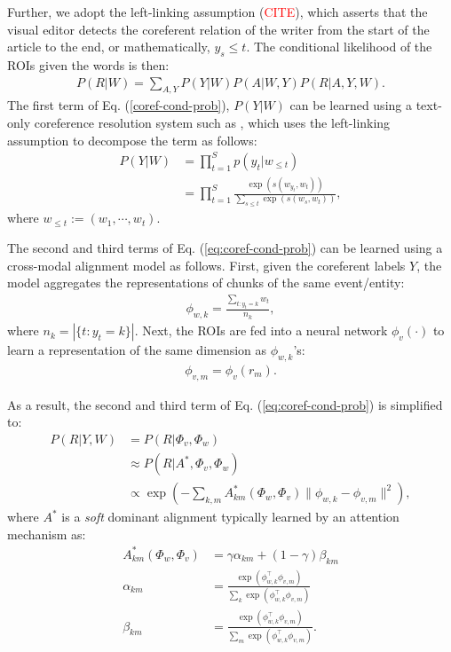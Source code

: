 \documentclass[11pt,a4paper]{article}
\begin{document}
 Further, we adopt the left-linking assumption (\textcolor{red}{CITE}), which asserts that the visual editor detects the coreferent relation of the writer from the start of the article to the end, or mathematically, $y_s \leq t$. The conditional likelihood of the ROIs given the words is then:
 \begin{align}\label{coref-cond-prob}
     P(R|W) = \sum_{A, Y} P(Y|W) P(A|W, Y) P(R|A, Y, W). 
 \end{align}
The first term of Eq. (\ref{coref-cond-prob}), $P(Y|W)$ can be learned using a text-only coreference resolution system such as \cite{Lee2017-neural-coref}, which uses the left-linking assumption to decompose the term as follows:
\begin{align}\label{left-link-coref-prob}
    P(Y|W) &= \prod_{t=1}^S p(y_t|w_{\leq t})\\
           &= \prod_{t=1}^S \frac{\exp(s(w_{y_t}, w_t))}{\sum_{s\leq t}\exp(s(w_{s}, w_t))},
\end{align}
where $w_{\leq t} := (w_1, \cdots, w_t)$. 

The second and third terms of Eq. (\ref{eq:coref-cond-prob}) can be learned using a cross-modal alignment model as follows. First, given the coreferent labels $Y$, the model aggregates the representations of chunks of the same event/entity:
\begin{align}\label{eq:sentence-enc}
    \phi_{w, k} = \frac{\sum_{t:y_t=k} w_{t}}{n_k}, 
\end{align}
where $n_k = |\{t:y_t=k\}|$. Next, the ROIs are fed into a neural network $\phi_v(\cdot)$ to learn a representation of the same dimension as $\phi_{w,k}$'s:
\begin{align}\label{eq:image-enc}
    \phi_{v, m} = \phi_v(r_m). 
\end{align}

As a result, the second and third term of Eq. (\ref{eq:coref-cond-prob}) is simplified to:
\begin{align}\label{eq:align-prob}
     P(R|Y, W) &= P(R|\Phi_v, \Phi_w) \\
     &\approx P(R|A^*, \Phi_v, \Phi_w)\\
     &\propto \exp\left(-\sum_{k, m}A^*_{km}(\Phi_w, \Phi_v) \|\phi_{w, k} -\phi_{v, m}\|^2\right), 
\end{align}
where $A^*$ is a \textit{soft} dominant alignment typically learned by an attention mechanism as:
\begin{align}\label{eq:}
    A^*_{km}(\Phi_w, \Phi_v) &=  \gamma \alpha_{km} + (1-\gamma)\beta_{km}\\
    \alpha_{km} &= \frac{\exp(\phi_{w,k}^\top\phi_{v,m})}{\sum_{k}\exp(\phi_{w,k}^\top\phi_{v,m})}\\
    \beta_{km}  &= \frac{\exp(\phi_{w,k}^\top\phi_{v,m})}{\sum_{m}\exp(\phi_{w,k}^\top\phi_{v,m})}.
\end{align}
\end{document}

